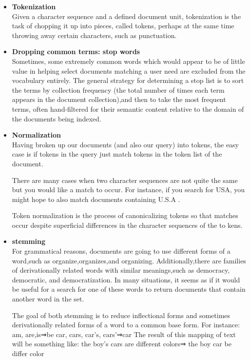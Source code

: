 \begin{itemize}
     \item \textbf{Tokenization}\\
     Given a character sequence and a defined document unit, tokenization is the
     task of chopping it up into pieces, called tokens, perhaps at the same time
     throwing away certain characters, such as punctuation.
     
     
     \item \textbf{Dropping common terms: stop words}\\
     Sometimes, some extremely common words which would appear to be of
     little value in helping select documents matching a user need are excluded
     from the vocabulary entirely.
     The general strategy for determining a stop list is to sort the terms by collection frequency (the total number of times each term appears in the document collection),and then to take the most frequent terms, often hand-filtered for their semantic content relative to the domain of the documents being indexed.
     
     
     \item  \textbf{Normalization}\\ 
     Having broken up our documents (and also our query) into tokens, the easy
     case is if tokens in the query just match tokens in the token list of the document.
     
     There are many cases when two character sequences are not quite the same but you would like a match to occur. For instance, if you search for USA, you might hope to also match documents containing U.S.A .
     
     Token normalization is the process of canonicalizing tokens so that matches occur despite superficial differences in the character sequences of the to kens.
    
    \item  \textbf{stemming}\\
    For grammatical reasons, documents are going to use different forms of a word,such as organize,organizes,and organizing. Additionally,there are families of derivationally related words with similar meanings,such as democracy, democratic, and democratization. In many situations, it seems as if it would be useful for a search for one of these words to return documents that contain another word in the set.
    
    The goal of both stemming is to reduce inﬂectional forms and sometimes derivationally related forms of a word to a common base form.
    For instance:
    am, are,is⇒be 
    car, cars, car’s, cars’⇒car 
    The result of this mapping of text will be something like:
    the boy’s cars are different colors⇒ the boy car be differ color
      
      
\end{itemize} 

